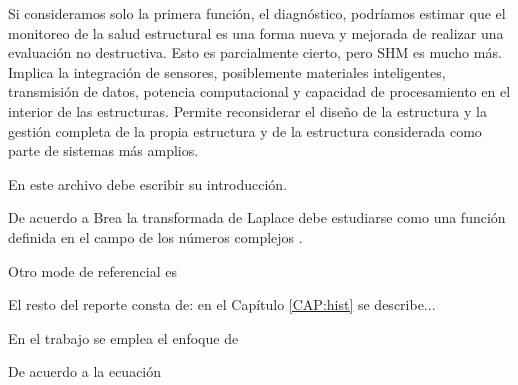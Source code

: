 Si consideramos solo la primera función, el diagnóstico, podríamos estimar que el monitoreo de la salud estructural es una forma nueva y mejorada de realizar una evaluación no destructiva. Esto es parcialmente cierto, pero SHM es mucho más. Implica la integración de sensores, posiblemente materiales inteligentes, transmisión de datos, potencia computacional y capacidad de procesamiento en el interior de las estructuras. Permite reconsiderar el diseño de la estructura y la gestión completa de la propia estructura y de la estructura considerada como parte de sistemas más amplios.


En este archivo debe escribir su introducción.

De acuerdo a Brea  la transformada de Laplace debe estudiarse como
una función definida en el campo de los números complejos
\cite{brea5}.

Otro mode de referencial es \citep{brea5}

El resto del reporte consta de: en el Capítulo \ref{CAP:hist} se
describe...

En el trabajo se emplea el enfoque de \cite{brigham1}

De acuerdo a la ecuación
